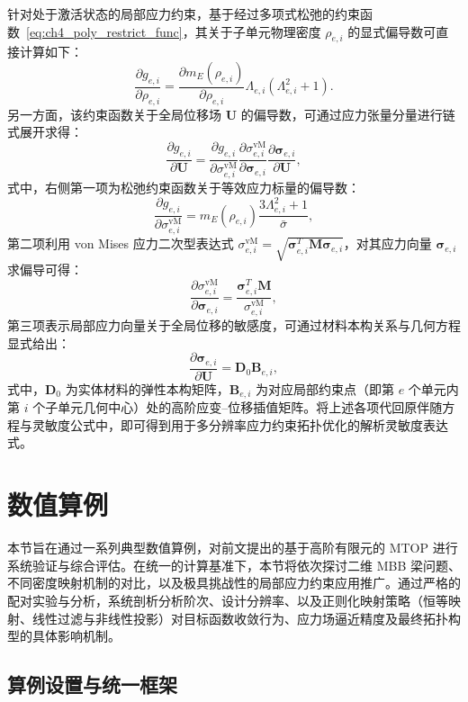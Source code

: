 针对处于激活状态的局部应力约束，基于经过多项式松弛的约束函数~\eqref{eq:ch4_poly_restrict_func}，其关于子单元物理密度 $\rho_{e,i}$ 的显式偏导数可直接计算如下：
\[
\frac{\partial g_{e,i}}{\partial\rho_{e,i}} = \frac{\partial m_E(\rho_{e,i})}{\partial\rho_{e,i}}\Lambda_{e,i}(\Lambda_{e,i}^2 + 1).
\]
另一方面，该约束函数关于全局位移场 $\boldsymbol{U}$ 的偏导数，可通过应力张量分量进行链式展开求得：
\[
\frac{\partial g_{e,i}}{\partial \boldsymbol{U}} = \frac{\partial g_{e,i}}{\partial\sigma_{e,i}^{\text{vM}}} \frac{\partial\sigma_{e,i}^{\text{vM}}}{\partial\boldsymbol{\sigma}_{e,i}} \frac{\partial\boldsymbol{\sigma}_{e,i}}{\partial \boldsymbol{U}},
\]
式中，右侧第一项为松弛约束函数关于等效应力标量的偏导数：
\[
\frac{\partial g_{e,i}}{\partial\sigma_{e,i}^{\text{vM}}} = m_E(\rho_{e,i})\frac{3\Lambda_{e,i}^2 + 1}{\bar{\sigma}},
\]
第二项利用 von Mises 应力二次型表达式 $\sigma_{e,i}^{\text{vM}} = \sqrt{\boldsymbol{\sigma}_{e,i}^T \boldsymbol{M} \boldsymbol{\sigma}_{e,i}}$，对其应力向量 $\boldsymbol{\sigma}_{e,i}$ 求偏导可得：
\[
\frac{\partial\sigma_{e,i}^{\text{vM}}}{\partial\boldsymbol{\sigma}_{e,i}} = \frac{\boldsymbol{\sigma}_{e,i}^T \boldsymbol{M}}{\sigma_{e,i}^{\text{vM}}},
\]
第三项表示局部应力向量关于全局位移的敏感度，可通过材料本构关系与几何方程显式给出：
\[
\frac{\partial\boldsymbol{\sigma}_{e,i}}{\partial \boldsymbol{U}} = \boldsymbol{D}_0\boldsymbol{B}_{e,i},
\]
式中，$\boldsymbol{D}_0$ 为实体材料的弹性本构矩阵，$\boldsymbol{B}_{e,i}$ 为对应局部约束点（即第 $e$ 个单元内第 $i$ 个子单元几何中心）处的高阶应变{--}位移插值矩阵。将上述各项代回原伴随方程与灵敏度公式中，即可得到用于多分辨率应力约束拓扑优化的解析灵敏度表达式。


\section{数值算例}
\label{sec:ch4_numerical_examples}

本节旨在通过一系列典型数值算例，对前文提出的基于高阶有限元的 MTOP 进行系统验证与综合评估。在统一的计算基准下，本节将依次探讨二维 MBB 梁问题、不同密度映射机制的对比，以及极具挑战性的局部应力约束应用推广。通过严格的配对实验与分析，系统剖析分析阶次、设计分辨率、以及正则化映射策略（恒等映射、线性过滤与非线性投影）对目标函数收敛行为、应力场逼近精度及最终拓扑构型的具体影响机制。


\subsection{算例设置与统一框架}
\label{subsec:ch4_setup_framework}

